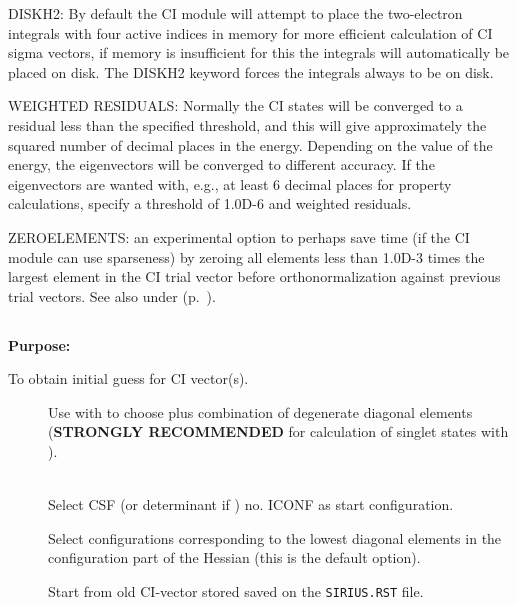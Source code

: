 
DISKH2: By default the CI module will attempt to place the two-electron
integrals with four active indices in memory for more efficient
calculation of CI sigma vectors, if memory is insufficient for this
the
integrals will automatically be placed on disk.  The DISKH2 keyword
forces the integrals always to be on disk.

WEIGHTED RESIDUALS:  Normally the CI states will be converged to a
residual less than the specified threshold, and this will give
approximately the squared number of decimal places in the energy.
Depending on the value of the energy, the eigenvectors will be converged
to different accuracy. If the eigenvectors are wanted with, e.g., at
least 6 decimal places for property calculations, specify a threshold of
1.0D-6 and weighted residuals.

ZEROELEMENTS: an experimental option to perhaps save time (if the CI
module can use sparseness) by zeroing all elements less than 1.0D-3
times the largest element in the CI trial vector before
orthonormalization against previous trial vectors.
See also  under 
(p.~\pageref{ref-optinp}).


\pagebreak[3]
\subsection{\label{ref-civinp}}

{\bf Purpose:}

To obtain initial guess for CI vector(s).

\begin{description}
\item[]
  Use with  to choose plus combination
  of degenerate   diagonal elements ({\bf STRONGLY RECOMMENDED} for
  calculation of singlet states  with ).

\item[]
   \\
  Select CSF (or determinant if ) no.
  ICONF as start configuration.

\item[]
  Select configurations corresponding to the lowest diagonal elements in
  the configuration part of the Hessian (this is the default option).

\item[]
  Start from old CI-vector stored saved on the \verb|SIRIUS.RST| file.


\end{description}

